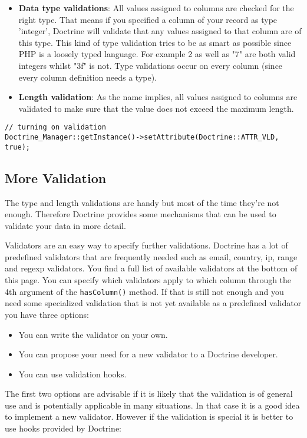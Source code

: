 \documentclass[11pt,a4paper]{report}
\begin{document}
\begin{itemize}
\item{\textbf{Data type validations}: All values assigned to columns are checked for the right type. That means if you specified a column of your record as type 'integer', Doctrine will validate that any values assigned to that column are of this type. This kind of type validation tries to be as smart as possible since PHP is a loosely typed language. For example 2 as well as "7" are both valid integers whilst "3f" is not. Type validations occur on every column (since every column definition needs a type).}
\item{\textbf{Length validation}: As the name implies, all values assigned to columns are validated to make sure that the value does not exceed the maximum length.}
\end{itemize}
\begin{verbatim}
// turning on validation
Doctrine_Manager::getInstance()->setAttribute(Doctrine::ATTR_VLD, true);
\end{verbatim}

\subsection{More Validation}
The type and length validations are handy but most of the time they're not enough. Therefore Doctrine provides some mechanisms that can be used to validate your data in more detail.

Validators are an easy way to specify further validations. Doctrine has a lot of predefined validators that are frequently needed such as email, country, ip, range and regexp validators. You find a full list of available validators at the bottom of this page. You can specify which validators apply to which column through the 4th argument of the \texttt{hasColumn()} method. If that is still not enough and you need some specialized validation that is not yet available as a predefined validator you have three options:

\begin{itemize}
\item{You can write the validator on your own.}
\item{You can propose your need for a new validator to a Doctrine developer.}
\item{You can use validation hooks.}
\end{itemize}
The first two options are advisable if it is likely that the validation is of general use and is potentially applicable in many situations. In that case it is a good idea to implement a new validator. However if the validation is special it is better to use hooks provided by Doctrine:
\end{document}
